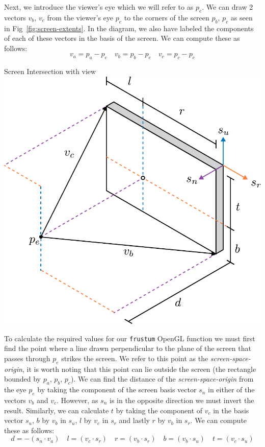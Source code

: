 Next, we introduce the viewer's eye which we will refer to as $p_e$. We can draw 2 vectors $v_b$, $v_c$ from the viewer's eye $p_e$ to the corners of the screen $p_b$, $p_c$ as seen in Fig~\ref{fig:screen-extents}. In the diagram, we also have labeled the components of each of these vectors in the basis of the screen. We can compute these as follows:
\[ v_a = p_a - p_e \quad v_b = p_b - p_e \quad v_c = p_c - p_e\] 

\begin{figureBox}[label={fig:screen-extents}, width=0.75\linewidth]{Screen Intersection with view}
    \includegraphics[width = 0.5\linewidth]{./background/figures/projection/eye-projection.pdf}
\end{figureBox}

To calculate the required values for our \texttt{frustum} OpenGL function we must first find the point where a line drawn perpendicular to the plane of the screen that passes through $p_e$ strikes the screen. We refer to this point as the {\it screen-space-origin}, it is worth noting that this point can lie outside the screen (the rectangle bounded by $p_a$, $p_b$, $p_c$). We can find the distance of the {\it screen-space-origin} from the eye $p_e$ by taking the component of the screen basis vector $s_n$ in either of the vectors $v_b$ and $v_c$. However, as $s_n$ is in the opposite direction we must invert the result. Similarly, we can calculate $t$ by taking the component of $v_c$ in the basis vector $s_u$, $b$ by $v_b$ in $s_u$, $l$ by $v_c$ in $s_r$ and lastly $r$ by $v_b$ in $s_r$. We can compute these as follows:
\[ d= -(s_n \cdot v_a) \quad l = (v_c \cdot s_r) \quad r = (v_b \cdot s_r) \quad b = (v_b \cdot s_u) \quad t = (v_c \cdot s_u) \]

